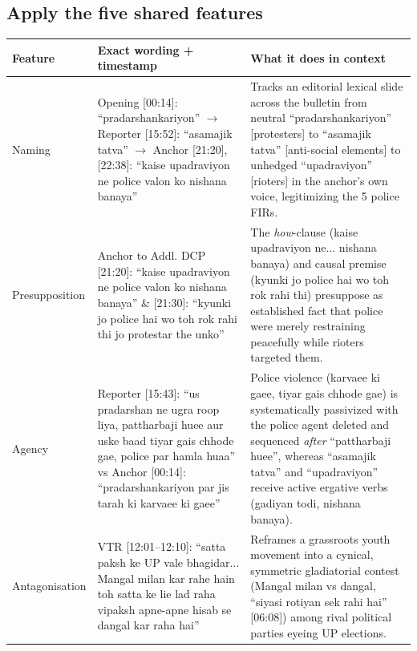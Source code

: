 \documentclass[10pt,a4paper]{article}
\begin{document}
\subsection*{Apply the five shared features}
\par\vspace{4pt}
{\small
\begin{longtable}{@{}>{\raggedright\arraybackslash}p{} >{\raggedright\arraybackslash}p{} >{\raggedright\arraybackslash}p{}@{}}
\toprule
\textbf{Feature} & \textbf{Exact wording + timestamp} & \textbf{What it does in context} \\
\midrule
\endhead
Naming & Opening [00:14]: ``pradarshankariyon'' $\rightarrow$ Reporter [15:52]: ``asamajik tatva'' $\rightarrow$ Anchor [21:20], [22:38]: ``kaise upadraviyon ne police valon ko nishana banaya'' & Tracks an editorial lexical slide across the bulletin from neutral ``pradarshankariyon'' [protesters] to ``asamajik tatva'' [anti-social elements] to unhedged ``upadraviyon'' [rioters] in the anchor's own voice, legitimizing the 5 police FIRs. \\
\addlinespace[6pt]
Presupposition & Anchor to Addl. DCP [21:20]: ``kaise upadraviyon ne police valon ko nishana banaya'' \& [21:30]: ``kyunki jo police hai wo toh rok rahi thi jo protestar the unko'' & The \emph{how}-clause (kaise upadraviyon ne... nishana banaya) and causal premise (kyunki jo police hai wo toh rok rahi thi) presuppose as established fact that police were merely restraining peacefully while rioters targeted them. \\
\addlinespace[6pt]
Agency & Reporter [15:43]: ``us pradarshan ne ugra roop liya, pattharbaji huee aur uske baad tiyar gais chhode gae, police par hamla huaa'' vs Anchor [00:14]: ``pradarshankariyon par jis tarah ki karvaee ki gaee'' & Police violence (karvaee ki gaee, tiyar gais chhode gae) is systematically passivized with the police agent deleted and sequenced \emph{after} ``pattharbaji huee'', whereas ``asamajik tatva'' and ``upadraviyon'' receive active ergative verbs (gadiyan todi, nishana banaya). \\
\addlinespace[6pt]
Antagonisation & VTR [12:01--12:10]: ``satta paksh ke UP vale bhagidar... Mangal milan kar rahe hain toh satta ke lie lad raha vipaksh apne-apne hisab se dangal kar raha hai'' & Reframes a grassroots youth movement into a cynical, symmetric gladiatorial contest (Mangal milan vs dangal, ``siyasi rotiyan sek rahi hai'' [06:08]) among rival political parties eyeing UP elections. \\

\end{longtable}}
\end{document}
